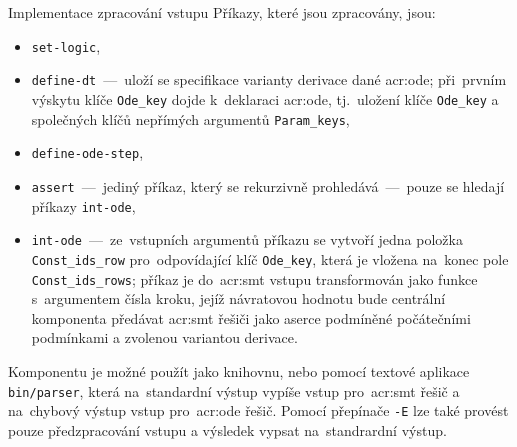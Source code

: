 \documentclass[thesis=M,czech]{FITthesis}[2012/06/26]
\newcommand{\acrlabel}[1]{acr:#1}
\newcommand{\acr}[1]{\acrshort{\acrlabel{#1}}}
\newcommand{\id}[1]{\texttt{#1}}
\begin{document}
\begin{section}{Implementace zpracování vstupu}
Příkazy, které jsou zpracovány, jsou:
\begin{itemize}
\item \id{set\--logic},
\item \id{define\--dt}~---~uloží se specifikace varianty
   derivace dané \acr{ode}; při~prvním výskytu
   klíče \id{Ode\_\-key} dojde k~deklaraci \acr{ode},
   tj.~uložení klíče \id{Ode\_\-key}
   a společných klíčů nepřímých argumentů \id{Param\_\-keys},
\item \id{define\--ode\--step},
\item \id{assert}~---~jediný příkaz, který se rekurzivně
   prohledává~---~pouze se hledají příkazy \id{int\--ode},
\item \id{int\--ode}~---~ze~vstupních argumentů příkazu
   se vytvoří jedna položka \id{Const\_\-ids\_\-row}
   pro~odpovídající klíč \id{Ode\_\-key},
   která je vložena na~konec pole \id{Const\_\-ids\_\-rows};
   příkaz je do~\acr{smt} vstupu transformován jako
   funkce s~argumentem čísla kroku, jejíž návratovou hodnotu
   bude centrální komponenta předávat \acr{smt} řešiči
   jako aserce podmíněné počátečními podmínkami
   a zvolenou variantou derivace.
\end{itemize}

Komponentu je možné použít jako knihovnu,
nebo pomocí textové aplikace \id{bin/parser},
která na~standardní výstup vypíše
vstup pro~\acr{smt} řešič
a na~chybový výstup
vstup pro~\acr{ode} řešič.
Pomocí přepínače \id{-E}
lze také provést pouze předzpracování vstupu
a výsledek vypsat na~standrardní výstup.
\end{section} %

\end{document}

